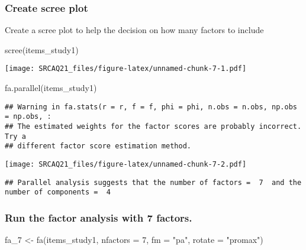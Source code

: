\documentclass[
]{article}
\newenvironment{Shaded}{\begin{snugshade}}{\end{snugshade}}
\newcommand{\AttributeTok}[1]{\textcolor[rgb]{0.77,0.63,0.00}{#1}}
\newcommand{\DecValTok}[1]{\textcolor[rgb]{0.00,0.00,0.81}{#1}}
\newcommand{\FunctionTok}[1]{\textcolor[rgb]{0.00,0.00,0.00}{#1}}
\newcommand{\NormalTok}[1]{#1}
\newcommand{\OtherTok}[1]{\textcolor[rgb]{0.56,0.35,0.01}{#1}}
\newcommand{\StringTok}[1]{\textcolor[rgb]{0.31,0.60,0.02}{#1}}
\begin{document}
\hypertarget{create-scree-plot}{%
\subsubsection{Create scree plot}\label{create-scree-plot}}

Create a scree plot to help the decision on how many factors to include

\begin{Shaded}
\begin{Highlighting}[]
\FunctionTok{scree}\NormalTok{(items\_study1)}
\end{Highlighting}
\end{Shaded}

\texttt{[image: SRCAQ21\_files/figure-latex/unnamed-chunk-7-1.pdf]}

\begin{Shaded}
\begin{Highlighting}[]
\FunctionTok{fa.parallel}\NormalTok{(items\_study1)}
\end{Highlighting}
\end{Shaded}

\begin{verbatim}
## Warning in fa.stats(r = r, f = f, phi = phi, n.obs = n.obs, np.obs = np.obs, :
## The estimated weights for the factor scores are probably incorrect. Try a
## different factor score estimation method.
\end{verbatim}

\texttt{[image: SRCAQ21\_files/figure-latex/unnamed-chunk-7-2.pdf]}

\begin{verbatim}
## Parallel analysis suggests that the number of factors =  7  and the number of components =  4
\end{verbatim}

\hypertarget{run-the-factor-analysis-with-7-factors.}{%
\subsubsection{Run the factor analysis with 7
factors.}\label{run-the-factor-analysis-with-7-factors.}}

\begin{Shaded}
\begin{Highlighting}[]
\NormalTok{fa\_7 }\OtherTok{\textless{}{-}} \FunctionTok{fa}\NormalTok{(items\_study1, }\AttributeTok{nfactors =} \DecValTok{7}\NormalTok{, }\AttributeTok{fm =} \StringTok{"pa"}\NormalTok{, }\AttributeTok{rotate =} \StringTok{"promax"}\NormalTok{)}
\end{Highlighting}
\end{Shaded}
\end{document}
